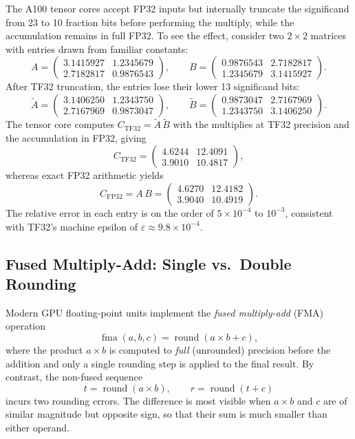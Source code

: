 The A100 tensor cores accept FP32 inputs but internally truncate the significand from 23 to 10 fraction bits before performing the multiply, while the accumulation remains in full FP32. To see the effect, consider two $2 \times 2$ matrices with entries drawn from familiar constants:
\[
    A = \begin{pmatrix} 3.1415927 & 1.2345679 \\ 2.7182817 & 0.9876543 \end{pmatrix}, \qquad
    B = \begin{pmatrix} 0.9876543 & 2.7182817 \\ 1.2345679 & 3.1415927 \end{pmatrix}.
\]
After TF32 truncation, the entries lose their lower 13 significand bits:
\[
    \tilde{A} = \begin{pmatrix} 3.1406250 & 1.2343750 \\ 2.7167969 & 0.9873047 \end{pmatrix}, \qquad
    \tilde{B} = \begin{pmatrix} 0.9873047 & 2.7167969 \\ 1.2343750 & 3.1406250 \end{pmatrix}.
\]
The tensor core computes $C_{\text{TF32}} = \tilde{A}\,\tilde{B}$ with the multiplies at TF32 precision and the accumulation in FP32, giving
\[
    C_{\text{TF32}} =
    \begin{pmatrix} 4.6244 & 12.4091 \\ 3.9010 & 10.4817 \end{pmatrix},
\]
whereas exact FP32 arithmetic yields
\[
    C_{\text{FP32}} = A\,B =
    \begin{pmatrix} 4.6270 & 12.4182 \\ 3.9040 & 10.4919 \end{pmatrix}.
\]
The relative error in each entry is on the order of $5 \times 10^{-4}$ to $10^{-3}$, consistent with TF32's machine epsilon of $\varepsilon \approx 9.8 \times 10^{-4}$.

\subsection{Fused Multiply-Add: Single vs.\ Double Rounding}\label{app:fma-example}

Modern GPU floating-point units implement the \emph{fused multiply-add} (FMA) operation
\[
    \operatorname{fma}(a, b, c) = \operatorname{round}(a \times b + c),
\]
where the product $a \times b$ is computed to \emph{full} (unrounded) precision before the addition and only a single rounding step is applied to the final result. By contrast, the non-fused sequence
\[
    t = \operatorname{round}(a \times b), \qquad r = \operatorname{round}(t + c)
\]
incurs two rounding errors. The difference is most visible when $a \times b$ and $c$ are of similar magnitude but opposite sign, so that their sum is much smaller than either operand.

